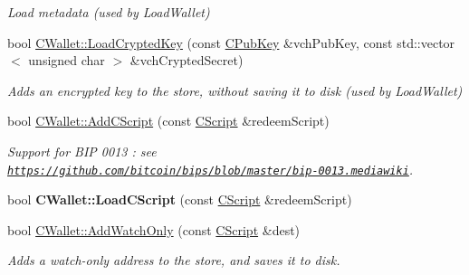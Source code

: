 \begin{DoxyCompactItemize}
\begin{DoxyCompactList}\small\item\em Load metadata (used by Load\+Wallet) \end{DoxyCompactList}\item 
\mbox{\label{group__map_wallet_ga01fbd78238d4ef833d059f12a7e8ac9f}} 
bool \mbox{\hyperlink{group__map_wallet_ga01fbd78238d4ef833d059f12a7e8ac9f}{C\+Wallet\+::\+Load\+Crypted\+Key}} (const \mbox{\hyperlink{class_c_pub_key}{C\+Pub\+Key}} \&vch\+Pub\+Key, const std\+::vector$<$ unsigned char $>$ \&vch\+Crypted\+Secret)
\begin{DoxyCompactList}\small\item\em Adds an encrypted key to the store, without saving it to disk (used by Load\+Wallet) \end{DoxyCompactList}\item 
\mbox{\label{group__map_wallet_gad7edacad1c926bc4b7fe0dc1be95ce31}} 
bool \mbox{\hyperlink{group__map_wallet_gad7edacad1c926bc4b7fe0dc1be95ce31}{C\+Wallet\+::\+Add\+C\+Script}} (const \mbox{\hyperlink{class_c_script}{C\+Script}} \&redeem\+Script)
\begin{DoxyCompactList}\small\item\em Support for B\+IP 0013 \+: see \href{https://github.com/bitcoin/bips/blob/master/bip-0013.mediawiki}{\tt https\+://github.\+com/bitcoin/bips/blob/master/bip-\/0013.\+mediawiki}. \end{DoxyCompactList}\item 
\mbox{\label{group__map_wallet_gadbf0abef9da8102f000d4afd5cec5bbc}} 
bool {\bfseries C\+Wallet\+::\+Load\+C\+Script} (const \mbox{\hyperlink{class_c_script}{C\+Script}} \&redeem\+Script)
\item 
\mbox{\label{group__map_wallet_ga022f12d5f56bbe831136388e2ac19969}} 
bool \mbox{\hyperlink{group__map_wallet_ga022f12d5f56bbe831136388e2ac19969}{C\+Wallet\+::\+Add\+Watch\+Only}} (const \mbox{\hyperlink{class_c_script}{C\+Script}} \&dest)
\begin{DoxyCompactList}\small\item\em Adds a watch-\/only address to the store, and saves it to disk. \end{DoxyCompactList}\item 
\mbox{\label{group__map_wallet_ga5be12b9afcf63079b8c009038843b5a2}} 

\end{DoxyCompactItemize}
